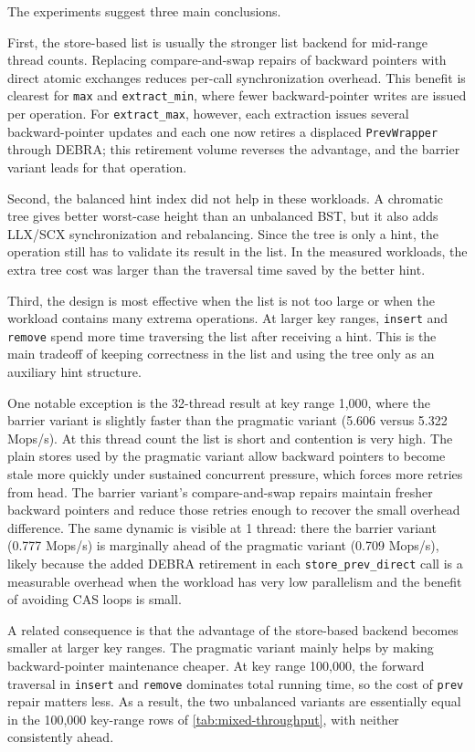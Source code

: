 \documentclass[a4paper,11pt]{article}
\newcommand{\code}[1]{\texttt{#1}}
\begin{document}
The experiments suggest three main conclusions.

First, the store-based list is usually the stronger list backend for mid-range thread counts. Replacing compare-and-swap repairs of backward pointers with direct atomic exchanges reduces per-call synchronization overhead. This benefit is clearest for \code{max} and \code{extract\_min}, where fewer backward-pointer writes are issued per operation. For \code{extract\_max}, however, each extraction issues several backward-pointer updates and each one now retires a displaced \code{PrevWrapper} through DEBRA; this retirement volume reverses the advantage, and the barrier variant leads for that operation.

Second, the balanced hint index did not help in these workloads. A chromatic tree gives better worst-case height than an unbalanced BST, but it also adds LLX/SCX synchronization and rebalancing. Since the tree is only a hint, the operation still has to validate its result in the list. In the measured workloads, the extra tree cost was larger than the traversal time saved by the better hint.

Third, the design is most effective when the list is not too large or when the workload contains many extrema operations. At larger key ranges, \code{insert} and \code{remove} spend more time traversing the list after receiving a hint. This is the main tradeoff of keeping correctness in the list and using the tree only as an auxiliary hint structure.

One notable exception is the 32-thread result at key range 1,000, where the barrier variant is slightly faster than the pragmatic variant (5.606 versus 5.322 Mops/s). At this thread count the list is short and contention is very high. The plain stores used by the pragmatic variant allow backward pointers to become stale more quickly under sustained concurrent pressure, which forces more retries from head. The barrier variant's compare-and-swap repairs maintain fresher backward pointers and reduce those retries enough to recover the small overhead difference. The same dynamic is visible at 1 thread: there the barrier variant (0.777 Mops/s) is marginally ahead of the pragmatic variant (0.709 Mops/s), likely because the added DEBRA retirement in each \code{store\_prev\_direct} call is a measurable overhead when the workload has very low parallelism and the benefit of avoiding CAS loops is small.

A related consequence is that the advantage of the store-based backend becomes smaller at larger key ranges. The pragmatic variant mainly helps by making backward-pointer maintenance cheaper. At key range 100,000, the forward traversal in \code{insert} and \code{remove} dominates total running time, so the cost of \code{prev} repair matters less. As a result, the two unbalanced variants are essentially equal in the 100,000 key-range rows of \cref{tab:mixed-throughput}, with neither consistently ahead.
\end{document}
